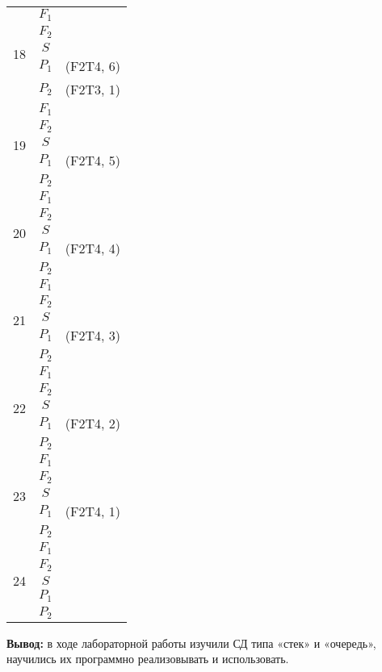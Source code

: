 \documentclass[a4paper,14pt]{extarticle}
\begin{document}
\begin{enumerate}
\begin{longtable}{|c|c|c|}
\multirow{5}{*}{18}&$F_1$&\\
\cline{2-3}
&$F_2$&\\
\cline{2-3}
& $S$ &\\
\cline{2-3}
&$P_1$&(F2T4, 6)\\
\cline{2-3}
&$P_2$&(F2T3, 1)\\
\hline


\multirow{5}{*}{19}&$F_1$&\\
\cline{2-3}
&$F_2$&\\
\cline{2-3}
& $S$ &\\
\cline{2-3}
&$P_1$&(F2T4, 5)\\
\cline{2-3}
&$P_2$&\\
\hline


\multirow{5}{*}{20}&$F_1$&\\
\cline{2-3}
&$F_2$&\\
\cline{2-3}
& $S$ &\\
\cline{2-3}
&$P_1$&(F2T4, 4)\\
\cline{2-3}
&$P_2$&\\
\hline


\multirow{5}{*}{21}&$F_1$&\\
\cline{2-3}
&$F_2$&\\
\cline{2-3}
& $S$ &\\
\cline{2-3}
&$P_1$&(F2T4, 3)\\
\cline{2-3}
&$P_2$&\\
\hline


\multirow{5}{*}{22}&$F_1$&\\
\cline{2-3}
&$F_2$&\\
\cline{2-3}
& $S$ &\\
\cline{2-3}
&$P_1$&(F2T4, 2)\\
\cline{2-3}
&$P_2$&\\
\hline


\multirow{5}{*}{23}&$F_1$&\\
\cline{2-3}
&$F_2$&\\
\cline{2-3}
& $S$ &\\
\cline{2-3}
&$P_1$&(F2T4, 1)\\
\cline{2-3}
&$P_2$&\\
\hline


\multirow{5}{*}{24}&$F_1$&\\
\cline{2-3}
&$F_2$&\\
\cline{2-3}
& $S$ &\\
\cline{2-3}
&$P_1$&\\
\cline{2-3}
&$P_2$&\\
\hline
\end{longtable}
\end{enumerate}
\textbf{Вывод: } в ходе лабораторной работы изучили СД типа «стек» и «очередь», научились их программно реализовывать и использовать.
\end{document}
